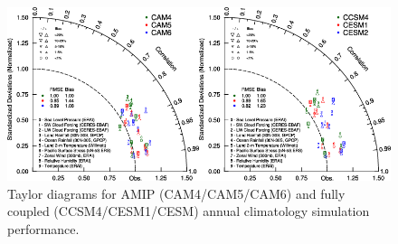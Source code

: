 \clearpage
\begin{figure}[t]
  \begin{center}
    \includegraphics[width=1.\textwidth,angle=0.]{./figs/f_TAYLOR_CAM_CESM.png}
  \end{center}
  \caption{Taylor diagrams \citep{Taylor2001} for AMIP (CAM4/CAM5/CAM6) and fully coupled (CCSM4/CESM1/CESM) annual climatology simulation performance.}
\label{f_TAYLOR_CAM_CESM}
\end{figure}

